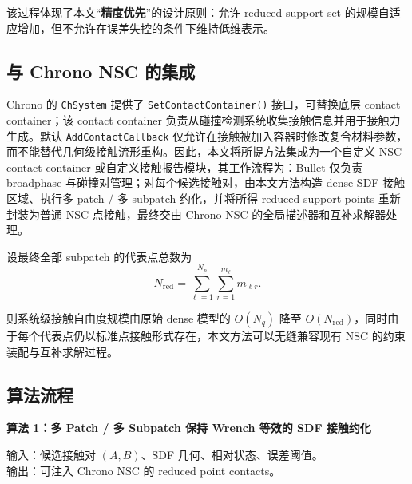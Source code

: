 \documentclass[UTF8,a4paper,11pt]{ctexart}
\begin{document}
该过程体现了本文“\textbf{精度优先}”的设计原则：允许 reduced support set 的规模自适应增加，但不允许在误差失控的条件下维持低维表示。

\subsection{与 Chrono NSC 的集成}

Chrono 的 \verb|ChSystem| 提供了 \verb|SetContactContainer()| 接口，可替换底层 contact container；该 contact container 负责从碰撞检测系统收集接触信息并用于接触力生成。默认 \verb|AddContactCallback| 仅允许在接触被加入容器时修改复合材料参数，而不能替代几何级接触流形重构。因此，本文将所提方法集成为一个自定义 NSC contact container 或自定义接触报告模块，其工作流程为：Bullet 仅负责 broadphase 与碰撞对管理；对每个候选接触对，由本文方法构造 dense SDF 接触区域、执行多 patch / 多 subpatch 约化，并将所得 reduced support points 重新封装为普通 NSC 点接触，最终交由 Chrono NSC 的全局描述器和互补求解器处理。

设最终全部 subpatch 的代表点总数为
\begin{equation}
N_{\mathrm{red}} = \sum_{\ell=1}^{N_p}\sum_{r=1}^{m_\ell} m_{\ell r}.
\end{equation}

则系统级接触自由度规模由原始 dense 模型的 $O(N_q)$ 降至 $O(N_{\mathrm{red}})$，同时由于每个代表点仍以标准点接触形式存在，本文方法可以无缝兼容现有 NSC 的约束装配与互补求解过程。

\subsection{算法流程}

\noindent\textbf{算法 1：多 Patch / 多 Subpatch 保持 Wrench 等效的 SDF 接触约化}

\noindent 输入：候选接触对 $(A,B)$、SDF 几何、相对状态、误差阈值。\\
\noindent 输出：可注入 Chrono NSC 的 reduced point contacts。
\end{document}
